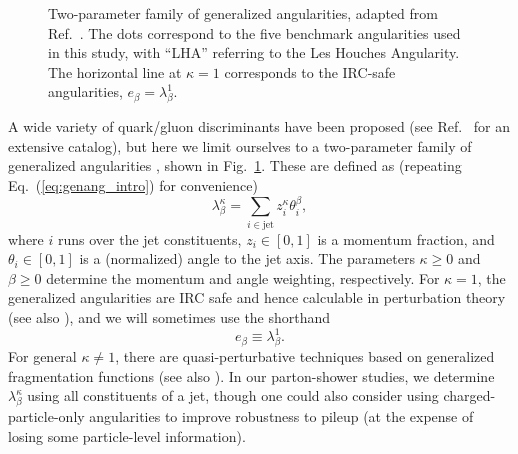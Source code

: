 \documentclass[11pt,letterpaper]{article}
\newcommand{\genang}[2]{{\lambda^{#1}_{#2}}}
\DeclareRobustCommand{\Fig}[1]{Fig.~\ref{#1}}
\DeclareRobustCommand{\Eq}[1]{Eq.~(\ref{#1})}
\DeclareRobustCommand{\Ref}[1]{Ref.~\cite{#1}}
\newcommand{\be}{\begin{equation}}
\newcommand{\ee}{\end{equation}}
\begin{document}
\begin{figure}
\centering
{}
\caption{Two-parameter family of generalized angularities, adapted from \Ref{Larkoski:2014pca}.  The dots correspond to the five benchmark angularities used in this study, with ``LHA'' referring to the Les Houches Angularity.  The horizontal line at $\kappa = 1$ corresponds to the IRC-safe angularities, $e_\beta = \lambda^{1}_{\beta}$.}
\label{fig:lambda_space}
\end{figure}

A wide variety of quark/gluon discriminants have been proposed (see \Ref{Gallicchio:2012ez} for an extensive catalog), but here we limit ourselves to a two-parameter family of generalized angularities \cite{Larkoski:2014pca}, shown in \Fig{fig:lambda_space}.  These are defined as (repeating \Eq{eq:genang_intro} for convenience)
\begin{equation}
\label{eq:genang}
\lambda^{\kappa}_{\beta} = \sum_{i \in \text{jet}} z_i^\kappa \theta_i^\beta,
\end{equation}
where $i$ runs over the jet constituents, $z_i \in [0,1]$ is a momentum fraction, and $\theta_i \in [0,1]$ is a (normalized) angle to the jet axis.  The parameters $\kappa \ge 0$ and $\beta \ge 0$ determine the momentum and angle weighting, respectively.  For $\kappa = 1$, the generalized angularities are IRC safe and hence calculable in perturbation theory \cite{Larkoski:2014uqa} (see also \cite{Ellis:2010rwa,Larkoski:2013paa,Larkoski:2014tva,Procura:2014cba,Hornig:2016ahz}), and we will sometimes use the shorthand
\be
e_\beta \equiv \genang{1}{\beta}. 
\ee
For general $\kappa \not= 1$, there are quasi-perturbative techniques based on generalized fragmentation functions \cite{Larkoski:2014pca} (see also \cite{Krohn:2012fg,Waalewijn:2012sv,Chang:2013rca,Chang:2013iba}).  In our parton-shower studies, we determine $\lambda^{\kappa}_{\beta}$ using all constituents of a jet, though one could also consider using charged-particle-only angularities to improve robustness to pileup (at the expense of losing some particle-level information).
\end{document}
